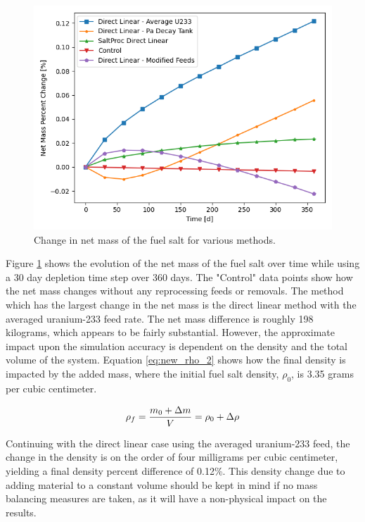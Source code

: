 \begin{figure}[H]
  \centering
  \includegraphics[scale=0.7]{images/net-mass-pcnt-change.png}
  \caption{Change in net mass of the fuel salt for various methods.}
   \label{fig:net-mass-bal}
\end{figure}

Figure \ref{fig:net-mass-bal} shows the evolution of the net mass of the fuel salt over time while using a 30 day depletion time step over 360 days. The "Control" data points show how the net mass changes without any reprocessing feeds or removals.
The method which has the largest change in the net mass is the direct linear method with the averaged uranium-233 feed rate. The net mass difference is roughly 198 kilograms, which appears to be fairly substantial. However, the approximate impact upon the simulation accuracy is dependent on the density and the total volume of the system. Equation \eqref{eq:new_rho_2} shows how the final density is impacted by the added mass, where the initial fuel salt density, $\rho_0$, is 3.35 grams per cubic centimeter.

\begin{equation} \hfill
\rho_f = \frac{m_0 + \Delta m}{V} = \rho_0 + \Delta \rho
\hfill\label{eq:new_rho_2} \end{equation}

Continuing with the direct linear case using the averaged uranium-233 feed, the change in the density is on the order of four milligrams per cubic centimeter, yielding a final density percent difference of 0.12\%. This density change due to adding material to a constant volume should be kept in mind if no mass balancing measures are taken, as it will have a non-physical impact on the results.

